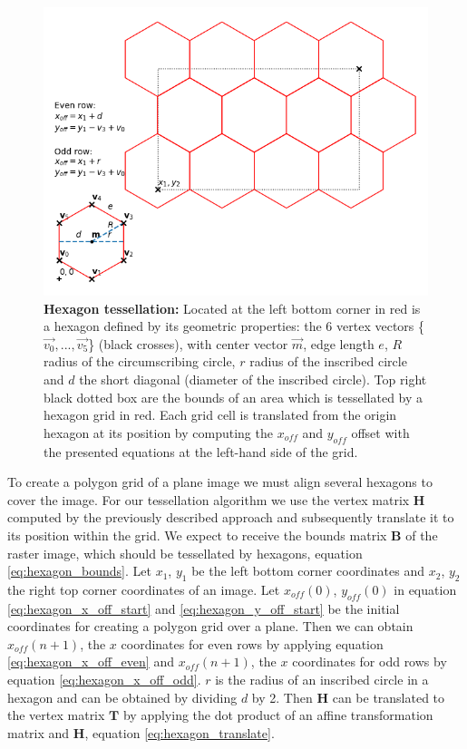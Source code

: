 		\begin{figure}[ht]
			\centering
			\includegraphics[scale=.66]{img/hexagons}
			\caption[Hexagon tessellation]{\textbf{Hexagon tessellation:} Located at the left bottom corner in red is a hexagon defined by its geometric properties: the 6 vertex vectors \{$\vec{v_0},...,\vec{v_5}$\} (black crosses), with center vector $\vec{m}$, edge length $e$, $R$ radius of the circumscribing circle, $r$ radius of the inscribed circle and $d$ the short diagonal (diameter of the inscribed circle). Top right black dotted box are the bounds of an area which is tessellated by a hexagon grid in red. Each grid cell is translated from the origin hexagon at its position by computing the $x_{off}$ and $y_{off}$ offset with the presented equations at the left-hand side of the grid. }
			\label{fig:hexagon}
		\end{figure}
		To create a polygon grid of a plane image we must align several hexagons to cover the image. For our tessellation algorithm we use the vertex matrix $\mathbf{H}$ computed by the previously described approach and subsequently translate it to its position within the grid. We expect to receive the bounds matrix $\mathbf{B}$ of the raster image, which should be tessellated by hexagons, equation \ref{eq:hexagon_bounds}. Let $x_1$, $y_1$ be the left bottom corner coordinates and $x_2$, $y_2$ the right top corner coordinates of an image. Let $x_{off}(0)$, $y_{off}(0)$ in equation \ref{eq:hexagon_x_off_start} and \ref{eq:hexagon_y_off_start} be the initial coordinates for creating a polygon grid over a plane. Then we can obtain $x_{off}(n+1)$, the $x$ coordinates for even rows by applying equation \ref{eq:hexagon_x_off_even} and $x_{off}(n+1)$, the $x$ coordinates for odd rows by equation \ref{eq:hexagon_x_off_odd}. $r$ is the radius of an inscribed circle in a hexagon and can be obtained by dividing $d$ by 2. Then $\mathbf{H}$ can be translated to the vertex matrix $\mathbf{T}$ by applying the dot product of an affine transformation matrix and $\mathbf{H}$, equation \ref{eq:hexagon_translate}.
